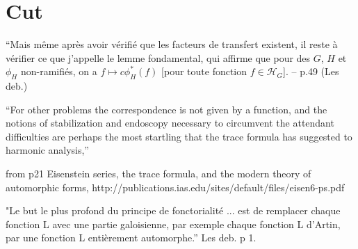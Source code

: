 \documentclass[brochure,english,12pt]{bourbaki}
\begin{document}
\section{Cut}


{\narrower \it

``Mais m\^eme apr\`es avoir
v\'erifi\'e que les facteurs de
transfert existent, il reste \`a v\'erifier ce que j'appelle le
lemme fondamental, qui affirme que pour des $G$, $H$ et $\phi_H$
non-ramifi\'es, on a $f\mapsto c \phi_H^*(f)$ [pour toute fonction $f\in {\mathcal H}_G$]. -- p.49 (Les deb.)  
}

\bigskip

``For other problems the correspondence is not given by a function, and the notions of 
stabilization and endoscopy necessary to circumvent the attendant difficulties are perhaps 
the most startling that the trace formula has suggested to harmonic analysis,'' 

from p21 Eisenstein series, the trace formula, and the modern theory of automorphic forms, http://publications.ias.edu/sites/default/files/eisen6-ps.pdf

"Le but le plus profond du principe de fonctorialit\'e ... est de remplacer chaque fonction L avec une partie galoisienne, par exemple chaque fonction L d'Artin, par une fonction L enti\`erement automorphe.'' Les deb. p 1.
\end{document}
